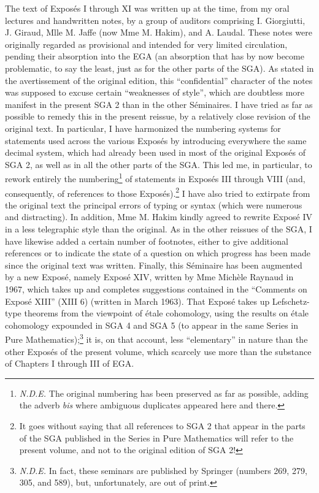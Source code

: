 \documentclass[
  11pt,
  a4paper,
]{book}
\begin{document}
The text of Exposés I through XI was written up at the time, from my
oral lectures and handwritten notes, by a group of auditors comprising
I. Giorgiutti, J. Giraud, Mlle M. Jaffe (now Mme M. Hakim), and A.
Laudal. These notes were originally regarded as provisional and intended
for very limited circulation, pending their absorption into the EGA (an
absorption that has by now become problematic, to say the least, just as
for the other parts of the SGA). As stated in the avertissement of the
original edition, this ``confidential'' character of the notes was
supposed to excuse certain ``weaknesses of style'', which are doubtless
more manifest in the present SGA 2 than in the other Séminaires. I have
tried as far as possible to remedy this in the present reissue, by a
relatively close revision of the original text. In particular, I have
harmonized the numbering systems for statements used across the various
Exposés by introducing everywhere the same decimal system, which had
already been used in most of the original Exposés of SGA 2, as well as
in all the other parts of the SGA. This led me, in particular, to rework
entirely the numbering\footnote{\emph{N.D.E.} The original numbering has
  been preserved as far as possible, adding the adverb \emph{bis} where
  ambiguous duplicates appeared here and there.} of statements in
Exposés III through VIII (and, consequently, of references to those
Exposés).\footnote{It goes without saying that all references to SGA 2
  that appear in the parts of the SGA published in the Series in Pure
  Mathematics will refer to the present volume, and not to the original
  edition of SGA 2!} I have also tried to extirpate from the original
text the principal errors of typing or syntax (which were numerous and
distracting). In addition, Mme M. Hakim kindly agreed to rewrite Exposé
IV in a less telegraphic style than the original. As in the other
reissues of the SGA, I have likewise added a certain number of
footnotes, either to give additional references or to indicate the state
of a question on which progress has been made since the original text
was written. Finally, this Séminaire has been augmented by a new Exposé,
namely Exposé XIV, written by Mme Michèle Raynaud in 1967, which takes
up and completes suggestions contained in the ``Comments on Exposé
XIII'' (XIII 6) (written in March 1963). That Exposé takes up
Lefschetz-type theorems from the viewpoint of étale cohomology, using
the results on étale cohomology expounded in SGA 4 and SGA 5 (to appear
in the same Series in Pure Mathematics);\footnote{\emph{N.D.E.} In fact,
  these seminars are published by Springer (numbers 269, 279, 305, and
  589), but, unfortunately, are out of print.} it is, on that account,
less ``elementary'' in nature than the other Exposés of the present
volume, which scarcely use more than the substance of Chapters I through
III of EGA.
\end{document}
